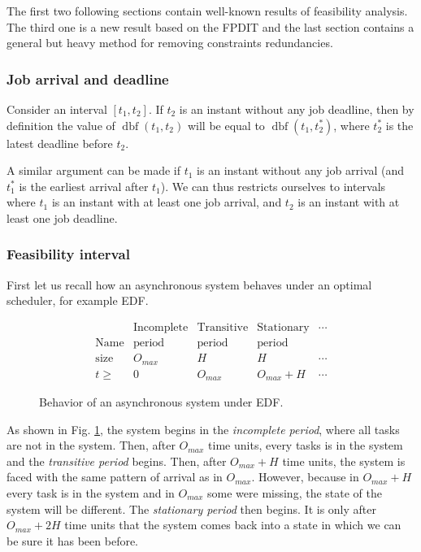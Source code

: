 \documentclass[conference]{IEEEtran}
\newcommand{\dbf}[1]{\operatorname{dbf}(#1)}
\begin{document}
		The first two following sections contain well-known results of feasibility analysis.
		The third one is a new result based on the FPDIT and the last section contains a general
		but heavy method for removing constraints redundancies.

		\subsubsection{Job arrival and deadline}
			Consider an interval $[t_1, t_2]$. If $t_2$ is an instant without any job
			deadline, then by definition the value of $\dbf{t_1, t_2}$ will be equal to
			$\dbf{t_1, t_2^*}$, where $t_2^*$ is the latest deadline before $t_2$.

			A similar argument can be made if $t_1$ is an instant without any job arrival
			(and $t_1^*$ is the earliest arrival after $t_1$). We can thus restricts
			ourselves to intervals where $t_1$ is an instant with at least one job
			arrival, and $t_2$ is an instant with at least one job deadline.

		\subsubsection{Feasibility interval}
			First let us recall how an asynchronous system behaves under an optimal
			scheduler, for example EDF.

			\begin{figure}[h]
				\[
					\begin{array}{r||c|c|c|l}
									& \text{Incomplete} & \text{Transitive} & \text{Stationary} & \cdots \\
						\text{Name} & \text{period} 	& \text{period} 	& \text{period}  	& \\ \hline
						\text{size} & O_{max} 			& H 				& H 				& \cdots \\ \hline
						t \geqslant & 0 				& O_{max} 			& O_{max} + H 		& \cdots
					\end{array}
				\]
				\begin{center}
				\caption{Behavior of an asynchronous system under EDF.}
				\label{fig:asyncBehavior}
				\end{center}
			\end{figure}

As shown in Fig. \ref{fig:asyncBehavior}, the system begins in the \emph{incomplete period}, where all tasks are not in the system. Then, after $O_{max}$ time units, every tasks is in the system and the \emph{transitive period} begins. Then, after $O_{max} + H$ time units, the system is faced with the same pattern of arrival as in $O_{max}$. However, because in $O_{max} + H$ every task is in the system and in $O_{max}$ some were missing, the state of the system will be different. The \emph{stationary period} then begins. It is only after $O_{max} + 2H$ time units that the system comes back into a state in which we can be sure it has been before.
\end{document}
